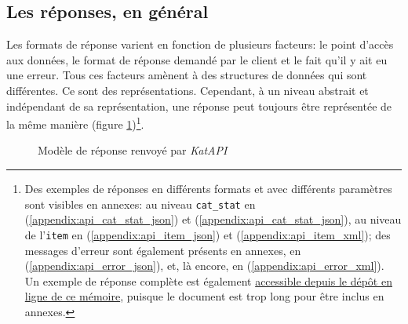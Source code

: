 \subsection{Les réponses, en général}
Les formats de réponse varient en fonction de plusieurs facteurs: le point d'accès aux données, le format de réponse demandé par le client et le fait qu'il y ait eu une erreur. Tous ces facteurs amènent à des structures de données qui sont différentes. Ce sont des représentations. Cependant, à un niveau abstrait et indépendant de sa représentation, une réponse peut toujours être représentée de la même manière (figure \ref{fig:response})\footnote{
	Des exemples de réponses en différents formats et avec différents paramètres sont visibles en annexes: au niveau \texttt{cat\_stat} en \json{} (\ref{appendix:api_cat_stat_json}) et \tei{} (\ref{appendix:api_cat_stat_json}), au niveau de l'\texttt{item} en \json{} (\ref{appendix:api_item_json}) et \tei{} (\ref{appendix:api_item_xml}); des messages d'erreur sont également présents en annexes, en \json{} (\ref{appendix:api_error_json}), et, là encore, en \tei{} (\ref{appendix:api_error_xml}). Un exemple de réponse complète est également \href{https://github.com/paulhectork/tnah2022_memoire/blob/main/texte_sources/annexes/api_cat_full.xml}{accessible depuis le dépôt en ligne de ce mémoire}, puisque le document est trop long pour être inclus en annexes.
}.

\begin{figure}[h!]
	\caption{Modèle de réponse renvoyé par \textit{KatAPI}}
	\label{fig:response}
\end{figure}

